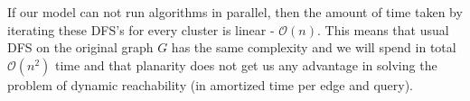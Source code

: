 If our model can not run algorithms in parallel, then the amount of time taken by iterating these DFS's for every cluster is linear - $\mathcal{O}(n)$. This means that usual DFS on the original graph $G$ has the same complexity and we will spend in total $\mathcal{O}(n^2)$ time and that planarity does not get us any advantage in solving the problem of dynamic reachability (in amortized time per edge and query). 

